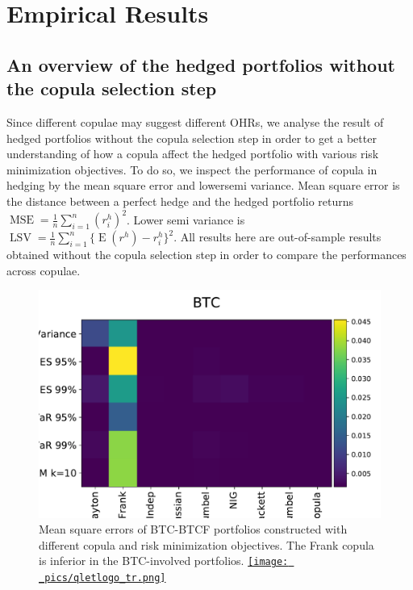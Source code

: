 \section{Empirical Results}\label{sec:results}



\subsection{An overview of the hedged portfolios without the copula selection step}\label{subsec:HP1}
Since different copulae may suggest different OHRs, we analyse the result of hedged portfolios without the copula selection step
in order to get a better understanding of how a copula affect the hedged portfolio with various risk minimization objectives.
To do so, we inspect the performance of copula in hedging by the mean square error and lowersemi variance.
Mean square error is the distance between a perfect hedge and the hedged portfolio returns $\operatorname{MSE}=\frac{1}{n}\sum_{i=1}^n(r^h_i)^2$.
Lower semi variance is $\operatorname{LSV}=\frac{1}{n}\sum_{i=1}^n\{\operatorname{E}(r^h)-r^h_i\}^2$.
All results here are out-of-sample results obtained without the copula selection step in order to compare the performances across copulae.  \medskip

\begin{figure}[th]
    \centering
    \includegraphics[width=\textwidth]{_pics/MSE_BTC.pdf}
  \caption{Mean square errors of BTC-BTCF portfolios constructed with different copula and risk minimization objectives.
    The Frank copula is inferior in the BTC-involved portfolios.
    \href{http://www.quantlet.com/}{\texttt{[image: \_pics/qletlogo\_tr.png]}} }
\label{fig:MSE_BTC}
\end{figure}

